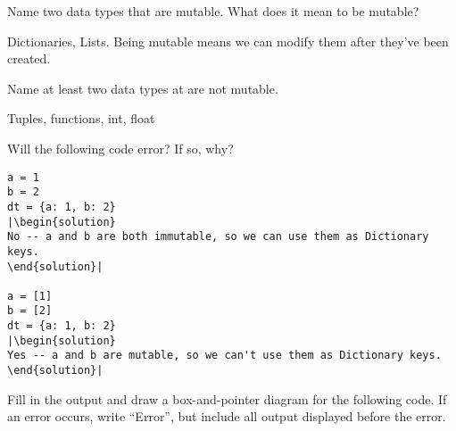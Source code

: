 \question
Name two data types that are mutable. What does it mean to be mutable?
\begin{solution}[0.25in]
Dictionaries, Lists. Being mutable means we can modify them after they've been created.
\end{solution}

\question
Name at least two data types at are not mutable.
\begin{solution}[0.25in]
Tuples, functions, int, float
\end{solution}

\question
Will the following code error? If so, why?
\begin{lstlisting}
a = 1
b = 2
dt = {a: 1, b: 2}
|\begin{solution}
No -- a and b are both immutable, so we can use them as Dictionary keys.
\end{solution}|

a = [1]
b = [2]
dt = {a: 1, b: 2}
|\begin{solution}
Yes -- a and b are mutable, so we can't use them as Dictionary keys.
\end{solution}|
\end{lstlisting}

\question
Fill in the output and draw a box-and-pointer diagram for the following code. If an error occurs, write “Error”, but include all output displayed before the error.

